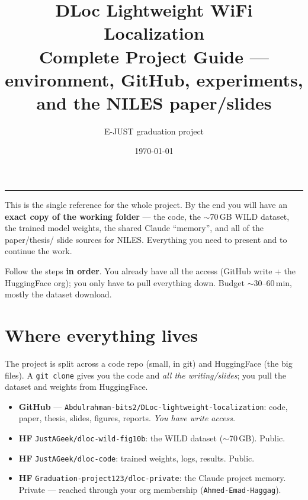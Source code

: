 \documentclass[11pt]{article}
\title{\textbf{DLoc Lightweight WiFi Localization}\\[2pt]
\large Complete Project Guide --- environment, GitHub, experiments, and the NILES paper/slides}
\author{E-JUST graduation project}
\date{\today}
\begin{document}
\maketitle
\vspace{-1.1em}\hrule\vspace{1em}

This is the single reference for the whole project. By the end you will have an
\textbf{exact copy of the working folder} --- the code, the $\sim$70\,GB WILD dataset,
the trained model weights, the shared Claude ``memory'', and all of the paper/thesis/
slide sources for NILES. Everything you need to present and to continue the work.

Follow the steps \textbf{in order}. You already have all the access (GitHub write +
the HuggingFace org); you only have to pull everything down. Budget $\sim$30--60\,min,
mostly the dataset download.

\section{Where everything lives}
The project is split across a code repo (small, in git) and HuggingFace (the big
files). A \texttt{git clone} gives you the code and \emph{all the writing/slides};
you pull the dataset and weights from HuggingFace.
\begin{itemize}[leftmargin=1.4em,itemsep=3pt]
\item \textbf{GitHub} --- \texttt{Abdulrahman-bits2/DLoc-lightweight-localization}:
      code, paper, thesis, slides, figures, reports. \emph{You have write access.}
\item \textbf{HF} \texttt{JustAGeek/dloc-wild-fig10b}: the WILD dataset ($\sim$70\,GB). Public.
\item \textbf{HF} \texttt{JustAGeek/dloc-code}: trained weights, logs, results. Public.
\item \textbf{HF} \texttt{Graduation-project123/dloc-private}: the Claude project
      memory. Private --- reached through your org membership (\texttt{Ahmed-Emad-Haggag}).
\end{itemize}

\end{document}
